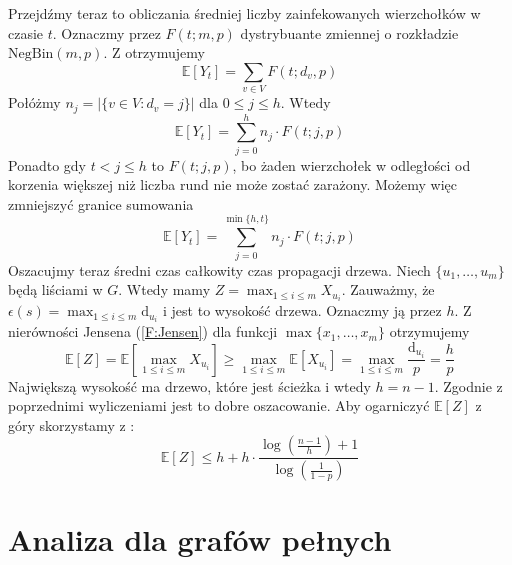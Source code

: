 Przejdźmy teraz to obliczania średniej liczby zainfekowanych wierzchołków w czasie $t$. Oznaczmy przez $F(t;m,p)$ dystrybuante zmiennej o rozkładzie $\mathrm{NegBin}(m,p)$. Z  otrzymujemy
\[
    \mathbb{E}[Y_t] = \sum_{v\in V} F(t; d_v, p)
\]
Połóżmy $n_j = |\{v\in V: d_v=j\}|$ dla $0\le j \le h$. Wtedy 
\[
    \mathbb{E}[Y_t] = \sum_{j=0}^{h} n_j\cdot F(t; j, p)
\]
Ponadto gdy $t<j\le h$ to $F(t; j, p)$, bo żaden wierzchołek w odległości od korzenia większej niż liczba rund nie może zostać zarażony. Możemy więc zmniejszyć granice sumowania 
\[
    \mathbb{E}[Y_t] = \sum_{j=0}^{\min\{h,t\}} n_j\cdot F(t; j, p)
\]
Oszacujmy teraz średni czas całkowity czas propagacji drzewa.
Niech $\{u_1,\dots, u_m\}$ będą liściami w $G$. Wtedy mamy $Z = \max_{1\le i \le m} X_{u _i}$.
Zauważmy, że $\epsilon(s) = \max_{1\le i \le m} \mathrm{d}_{u_i}$ i jest to wysokość drzewa. Oznaczmy ją przez $h$. Z nierówności Jensena (\cref{F:Jensen}) dla funkcji $\max\{x_1,\dots,x_m\}$ otrzymujemy
\[
    \mathbb{E}[Z]=\mathbb{E}[\max_{1\le i \le m} X_{u _i}] \ge \max_{1\le i \le m} \mathbb{E}[X_{u _i}] = \max_{1\le i \le m} \frac{\mathrm{d}_{u_i}}{p} = \frac{h}{p}
\]
Największą wysokość ma drzewo, które jest ścieżka i wtedy $h=n-1$. Zgodnie z poprzednimi wyliczeniami jest to dobre oszacowanie. Aby ogarniczyć $\mathbb{E}[Z]$ z góry skorzystamy z :
\[
    \mathbb{E}[Z] \le h  + h \cdot \frac{\log(\frac{n-1}{h}) + 1}{\log(\frac{1}{1-p})}
\]


\section{Analiza dla grafów pełnych}

